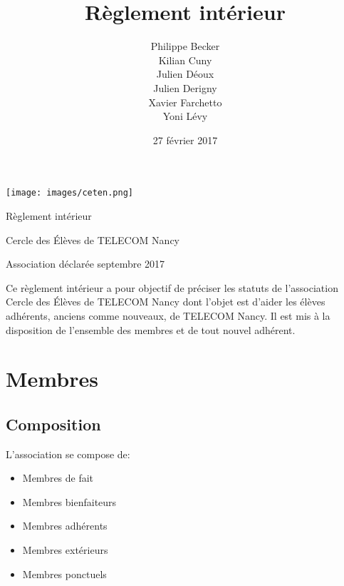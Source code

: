 \documentclass{article} %
\title{Règlement intérieur}
\author{Philippe Becker \\
	Kilian Cuny \\
	Julien Déoux \\
	Julien Derigny \\
	Xavier Farchetto \\
	Yoni Lévy }
\date{27 février 2017}
\begin{document}

	
	\begin{titlepage}
		\begin{center}
			\texttt{[image: images/ceten.png]}\par
			\vspace{3cm}
			{\Huge\light{} Règlement intérieur}\par
			\vfill
			{\large Cercle des Élèves de TELECOM Nancy}\par
			{\large\light{} Association déclarée}
			\vfill
			{ septembre 2017}\par
		\end{center}
	\end{titlepage}
	
	
	\tableofcontents

	
	\vfill
	\begin{center}
		{\light{} Ce règlement intérieur a pour objectif de préciser les statuts
		de l’association Cercle des Élèves de TELECOM Nancy dont l’objet est
		d’aider les élèves adhérents, anciens comme nouveaux, de TELECOM Nancy.
		Il est mis à la disposition de l’ensemble des membres et de tout nouvel
		adhérent.}
	\end{center}
	\vfill

	\clearpage



	\section{Membres}
\label{sec:membres}

		\subsection{Composition}
\label{sub:composition}

			L’association se compose de:
			\begin{itemize}
				\item Membres de fait
				\item Membres bienfaiteurs
				\item Membres adhérents
				\item Membres extérieurs
				\item Membres ponctuels
			\end{itemize}
\end{document}
